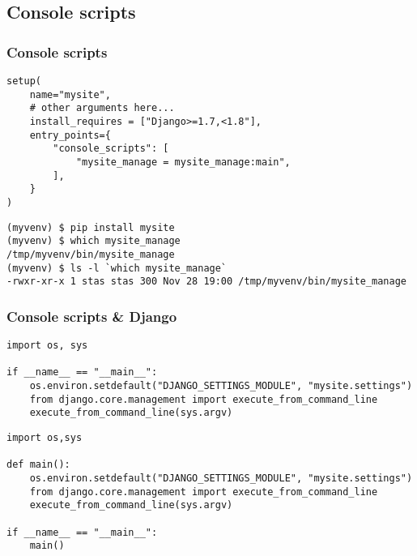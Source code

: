 \documentclass[10pt,pdf,utf8,russian,aspectratio=169,xcolor=dvipsnames,x11names,center]{beamer}
\begin{document}
\subsection{Console scripts}
\begin{frame}[fragile]
  \frametitle{Console scripts}
  \begin{minipage}{13.7cm}

  \begin{lstlisting}
setup(
    name="mysite",
    # other arguments here...
    install_requires = ["Django>=1.7,<1.8"],
    entry_points={
        "console_scripts": [
            "mysite_manage = mysite_manage:main",
        ],
    }
)
  \end{lstlisting}

  \pause

  \begin{lstlisting}
(myvenv) $ pip install mysite
(myvenv) $ which mysite_manage
/tmp/myvenv/bin/mysite_manage
(myvenv) $ ls -l `which mysite_manage`
-rwxr-xr-x 1 stas stas 300 Nov 28 19:00 /tmp/myvenv/bin/mysite_manage
  \end{lstlisting}

  \end{minipage}
\end{frame}

\begin{frame}[fragile]
  \frametitle{Console scripts \& Django}

  \begin{lstlisting}[caption=manage.py из состава Django,basicstyle=\ttfamily\footnotesize]
import os, sys

if __name__ == "__main__":
    os.environ.setdefault("DJANGO_SETTINGS_MODULE", "mysite.settings")
    from django.core.management import execute_from_command_line
    execute_from_command_line(sys.argv)
  \end{lstlisting}

  \begin{lstlisting}[caption=mysite\_manage.py,basicstyle=\ttfamily\footnotesize]
import os,sys

def main():
    os.environ.setdefault("DJANGO_SETTINGS_MODULE", "mysite.settings")
    from django.core.management import execute_from_command_line
    execute_from_command_line(sys.argv)

if __name__ == "__main__":
    main()
  \end{lstlisting}

\end{frame}
\end{document}
